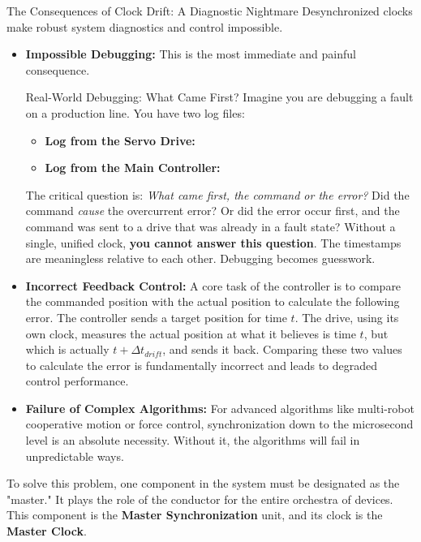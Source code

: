 \begin{dangerbox}{The Consequences of Clock Drift: A Diagnostic Nightmare}
Desynchronized clocks make robust system diagnostics and control impossible.

\begin{itemize}
    \item \textbf{Impossible Debugging:} This is the most immediate and painful consequence.
    \begin{tipbox}{Real-World Debugging: What Came First?}
        Imagine you are debugging a fault on a production line. You have two log files:
        \begin{itemize}
            \item \textbf{Log from the Servo Drive:} 
            \item \textbf{Log from the Main Controller:} 
        \end{itemize}
        The critical question is: \textit{What came first, the command or the error?} Did the command \textit{cause} the overcurrent error? Or did the error occur first, and the command was sent to a drive that was already in a fault state? Without a single, unified clock, \textbf{you cannot answer this question}. The timestamps are meaningless relative to each other. Debugging becomes guesswork.
    \end{tipbox}
    
    \item \textbf{Incorrect Feedback Control:} A core task of the controller is to compare the commanded position with the actual position to calculate the following error. The controller sends a target position for time $t$. The drive, using its own clock, measures the actual position at what it believes is time $t$, but which is actually $t + \Delta t_{drift}$, and sends it back. Comparing these two values to calculate the error is fundamentally incorrect and leads to degraded control performance.
    
    \item \textbf{Failure of Complex Algorithms:} For advanced algorithms like multi-robot cooperative motion or force control, synchronization down to the microsecond level is an absolute necessity. Without it, the algorithms will fail in unpredictable ways.
\end{itemize}
\end{dangerbox}

To solve this problem, one component in the system must be designated as the "master." It plays the role of the conductor for the entire orchestra of devices. This component is the \textbf{Master Synchronization} unit, and its clock is the \textbf{Master Clock}.

